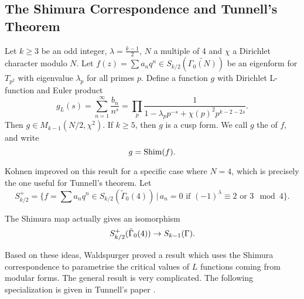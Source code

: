 \documentclass[12pt, a4paper]{amsart}
\begin{document}
\subsection{The Shimura Correspondence and Tunnell's Theorem}

\begin{thm}
  Let $k \geq 3$ be an odd integer, $\lambda = \frac{k-1}{2}$, $N$ a multiple of
  4 and $\chi$ a Dirichlet character modulo $N$. Let $f(z) = \sum a_n q^n \in
  S_{k/2}(\tilde{\Gamma_0(N)})$ be an eigenform for $T_{p^2}$ with eigenvalue
  $\lambda_p$ for all primes $p$. Define a function $g$ with Dirichlet
  L-function and Euler product
  \[g_L(s) = \sum\limits_{n=1}^\infty \frac{b_n}{n^s} = \prod\limits_p
    \frac{1}{1 - \lambda_p p^{-s} + \chi(p)^2 p^{k-2-2s}}.\]
  Then $g \in M_{k-1}(N/2, \chi^2)$.
  If $k \geq 5$, then $g$ is a cusp form. We call $g$ the
   of $f$, and write
  \[g = \textnormal{Shim}(f).\]
\end{thm}

Kohnen improved on this result for a specific case where $N = 4$, which is
precisely the one useful for Tunnell's theorem. Let
\[S_{k/2}^+ = \{f = \sum a_n q^n \in S_{k/2}(\tilde{\Gamma}_0(4)) \, | \,
  a_n = 0 \text{ if } (-1)^\lambda \equiv 2 \text{ or } 3 \mod{4}\}.\]

\begin{thm}
  The Shimura map actually gives an isomorphism
  \[S_{k/2}^+(\tilde{\Gamma}_0(4)) \rightarrow S_{k-1}(\Gamma).\]
\end{thm}

Based on these ideas, Waldspurger proved a result which uses the Shimura
correspondence to parametrise the critical values of $L$ functions coming from
modular forms. The general result is very complicated. The following
specialization is given in Tunnell's paper \cite[Page 328]{Tunnell}.

\end{document}
